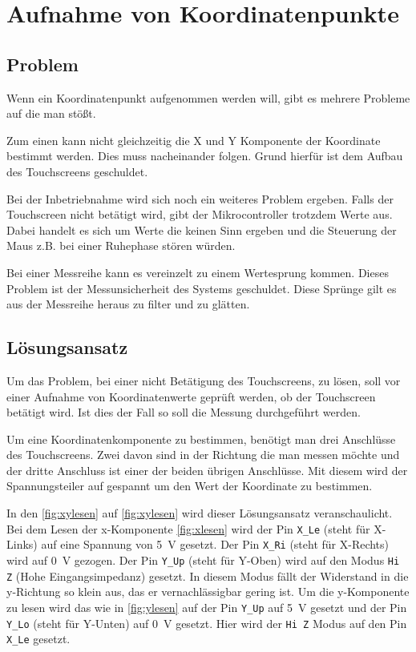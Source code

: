 \chapter{Aufnahme von Koordinatenpunkte}
\section{Problem}
Wenn ein Koordinatenpunkt aufgenommen werden will, gibt es mehrere Probleme auf die man stößt.

Zum einen kann nicht gleichzeitig die X und Y Komponente der Koordinate bestimmt werden. Dies muss nacheinander folgen.
Grund hierfür ist dem Aufbau des Touchscreens geschuldet.

Bei der Inbetriebnahme wird sich noch ein weiteres Problem ergeben.
Falls der Touchscreen nicht betätigt wird, gibt der Mikrocontroller trotzdem Werte aus.
Dabei handelt es sich um Werte die keinen Sinn ergeben und die Steuerung der Maus z.B. bei einer Ruhephase stören würden.

Bei einer Messreihe kann es vereinzelt zu einem Wertesprung kommen. 
Dieses Problem ist der Messunsicherheit des Systems geschuldet. 
Diese Sprünge gilt es aus der Messreihe heraus zu filter und zu glätten.

\section{Lösungsansatz}
Um das Problem, bei einer nicht Betätigung des Touchscreens, zu lösen, soll vor einer Aufnahme von Koordinatenwerte geprüft werden, ob der Touchscreen betätigt wird.
Ist dies der Fall so soll die Messung durchgeführt werden.

Um eine Koordinatenkomponente zu bestimmen, benötigt man drei Anschlüsse des Touchscreens.
Zwei davon sind in der Richtung die man messen möchte und der dritte Anschluss ist einer der beiden übrigen Anschlüsse.
Mit diesem wird der Spannungsteiler auf gespannt um den Wert der Koordinate zu bestimmen.

In den \cref{fig:xylesen} auf \cref{fig:xylesen} wird dieser Lösungsansatz veranschaulicht.
Bei dem Lesen der x-Komponente \cref{fig:xlesen} wird der Pin \verb$X_Le$ (steht für X-Links) auf eine Spannung von \SI{5}{V} gesetzt.
Der Pin \verb$X_Ri$ (steht für X-Rechts) wird auf \SI{0}{V} gezogen.
Der Pin  \verb$Y_Up$ (steht für Y-Oben) wird auf den Modus \verb$Hi Z$ (Hohe Eingangsimpedanz) gesetzt. In diesem Modus fällt der Widerstand in die y-Richtung so klein aus, das er vernachlässigbar gering ist.
Um die y-Komponente zu lesen wird das wie in \cref{fig:ylesen} auf  der Pin \verb$Y_Up$ auf \SI{5}{V} gesetzt und der Pin \verb$Y_Lo$ (steht für Y-Unten) auf \SI{0}{V} gesetzt.
Hier wird der \verb$Hi Z$ Modus auf den Pin \verb$X_Le$ gesetzt.

